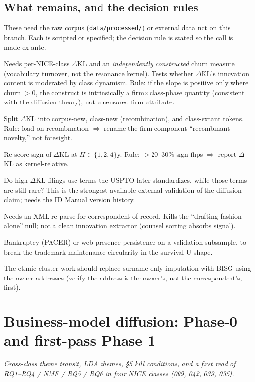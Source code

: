 \documentclass[11pt]{report}
\newcommand{\dkl}{$\Delta$KL}
\begin{document}
\section{What remains, and the decision rules}\label{sec:blocked}
These need the raw corpus (\texttt{data/processed/}) or external data not on this
branch. Each is scripted or specified; the decision rule is stated so the call is
made ex ante.
\begin{description}[nosep,style=nextline]
\item[Interaction estimand ($\beta\times$churn).] Needs per-NICE-class \dkl{}
and an \emph{independently constructed} churn measure (vocabulary turnover, not
the resonance kernel). Tests whether \dkl{}'s innovation content is moderated by
class dynamism. Rule: if the slope is positive only where churn $>0$, the
construct is intrinsically a firm$\times$class-phase quantity (consistent with the
diffusion theory), not a censored firm attribute.
\item[Term provenance (three-way).] Split \dkl{} into corpus-new, class-new
(recombination), and class-extant tokens. Rule: load on recombination $\Rightarrow$
rename the firm component ``recombinant novelty,'' not foresight.
\item[Half-life sensitivity.] Re-score sign of \dkl{} at $H\in\{1,2,4\}$y. Rule:
$>$20--30\% sign flips $\Rightarrow$ report \dkl{} as kernel-relative.
\item[ID-Manual codification (external).] Do high-\dkl{} filings use terms the
USPTO later standardizes, while those terms are still rare? This is the strongest
available external validation of the diffusion claim; needs the ID Manual version
history.
\item[Attorney fixed effects.] Needs an XML re-parse for correspondent of record.
Kills the ``drafting-fashion alone'' null; not a clean innovation extractor
(counsel sorting absorbs signal).
\item[External survival outcome.] Bankruptcy (PACER) or web-presence persistence
on a validation subsample, to break the trademark-maintenance circularity in the
survival U-shape.
\item[BISG demographics.] The ethnic-cluster work should replace surname-only
imputation with BISG using the owner addresses (verify the address is the owner's,
not the correspondent's, first).
\end{description}

\chapter{Business-model diffusion: Phase-0 and first-pass Phase 1}
\noindent\textit{Cross-class theme transit, LDA themes, §5 kill conditions, and a first read of RQ1--RQ4 / NMF / RQ5 / RQ6 in four NICE classes (009, 042, 039, 035).}\medskip
\end{document}
